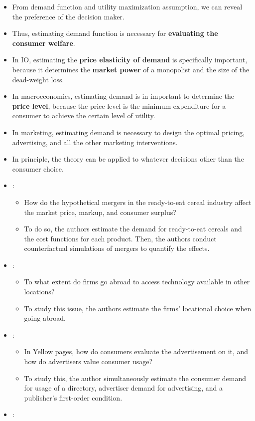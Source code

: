 \documentclass[]{book}
\providecommand{\tightlist}{%
  \setlength{\itemsep}{0pt}\setlength{\parskip}{0pt}}
\begin{document}
\begin{itemize}
\item
  From demand function and utility maximization assumption, we can
  reveal the preference of the decision maker.
\item
  Thus, estimating demand function is necessary for \textbf{evaluating
  the consumer welfare}.
\item
  In IO, estimating the \textbf{price elasticity of demand} is
  specifically important, because it determines the \textbf{market
  power} of a monopolist and the size of the dead-weight loss.
\item
  In macroeconomics, estimating demand is in important to determine the
  \textbf{price level}, because the price level is the minimum
  expenditure for a consumer to achieve the certain level of utility.
\item
  In marketing, estimating demand is necessary to design the optimal
  pricing, advertising, and all the other marketing interventions.
\item
  In principle, the theory can be applied to whatever decisions other
  than the consumer choice.
\item
  \citet{Nevo2000c}:

  \begin{itemize}
  \tightlist
  \item
    How do the hypothetical mergers in the ready-to-eat cereal industry
    affect the market price, markup, and consumer surplus?
  \item
    To do so, the authors estimate the demand for ready-to-eat cereals
    and the cost functions for each product. Then, the authors conduct
    counterfactual simulations of mergers to quantify the effects.
  \end{itemize}
\item
  \citet{Chung2002}:

  \begin{itemize}
  \tightlist
  \item
    To what extent do firms go abroad to access technology available in
    other locations?
  \item
    To study this issue, the authors estimate the firms' locational
    choice when going abroad.
  \end{itemize}
\item
  \citet{Rysman2004}:

  \begin{itemize}
  \tightlist
  \item
    In Yellow pages, how do consumers evaluate the advertisement on it,
    and how do advertisers value consumer usage?
  \item
    To study this, the author simultaneously estimate the consumer
    demand for usage of a directory, advertiser demand for advertising,
    and a publisher's first-order condition.
  \end{itemize}
\item
  \citet{Gentzkow2004}:


\end{itemize}
\end{document}
